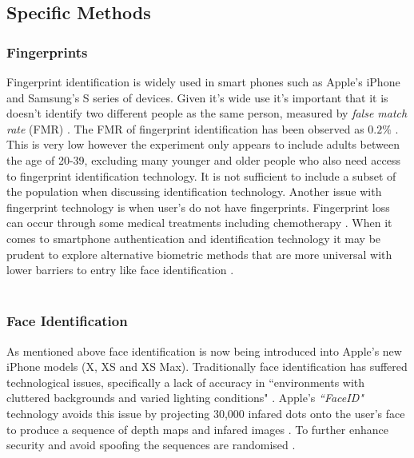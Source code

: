 \documentclass[12pt]{article}
\begin{document}
	\subsection{Specific Methods}
	\label{subsect:specific_methods}
	\subsubsection{Fingerprints}
	\label{subsubsect:fingerprints}
	Fingerprint identification is widely used in smart phones such as Apple's iPhone and Samsung's S series of devices. Given it's wide use it's important that it is doesn't identify two different people as the same person, measured by \emph{false match rate} (FMR) \citep{delac2004survey}. The FMR of fingerprint identification has been observed as $0.2\%$ \citep{delac2004survey}. This is very low however the experiment only appears to include adults between the age of 20-39, excluding many younger and older people who also need access to fingerprint identification technology. It is not sufficient to include a subset of the population when discussing identification technology. Another issue with fingerprint technology is when user's do not have fingerprints. Fingerprint loss can occur through some medical treatments including chemotherapy \citep{al2012chemotherapy}. When it comes to smartphone authentication and identification technology it may be prudent to explore alternative biometric methods that are more universal with lower barriers to entry like face identification \citep{prabhakar2003biometric}.
	\\
	\\
	\subsubsection{Face Identification}
	\label{subsubsect:face_identification}
	As mentioned above face identification is now being introduced into Apple's new iPhone models (X, XS and XS Max). Traditionally face identification has suffered technological issues, specifically a lack of accuracy in ``environments with cluttered backgrounds and varied lighting conditions" \citep{prabhakar2003biometric}. Apple's \emph{``FaceID"} technology avoids this issue by projecting 30,000 infared dots onto the user's face to produce a sequence of depth maps and infared images \citep{apple_faceid_2017}. To further enhance security and avoid spoofing the sequences are randomised \citep{apple_faceid_2017}.
	\\
	\\
\end{document}
